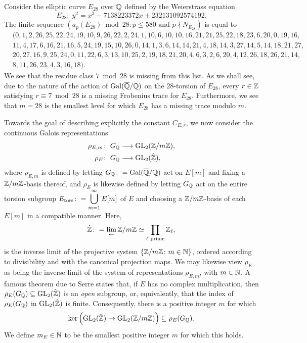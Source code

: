 \begin{example} \label{level28example}
Consider the elliptic curve $E_{28}$ over $\mathbb{Q}$ defined by the Weierstrass equation
\[
E_{28} \colon \; y^2 = x^3 - 7138223372x + 232131092574192.
\]
The finite sequence $\left( a_p(E_{28}) \bmod 28 \colon  p \leq 580 \text{ and } p \nmid N_{E_{28}} \right)$ is equal to
\[
\begin{split}
&( 0, 1, 2, 26, 25, 22, 24, 19, 10, 9, 26, 22, 2, 24, 1, 10, 6, 10, 10, 16, 21, 
21, 25, 22, 18, 23, 6, 20, 0, 19, 16, \\
& 11, 4, 17, 6, 16, 21, 16, 5, 24, 19, 15, 
10, 26, 0, 14, 1, 3, 6, 14, 14, 21, 4, 18, 14, 3, 27, 14, 5, 14, 18, 21, 27,\\
&  20, 27, 16, 9, 25, 24, 0, 11, 22, 6, 3, 13, 10, 25, 2, 19, 18, 21, 20, 4, 6, 3, 2, 6, 20, 4, 12, 26, 18, 26,   21, 14, \\
& 8, 11, 26, 23, 4, 3, 16, 18).
\end{split}
\]
We see that the residue class $7 \bmod 28$ is missing from this list.  As we shall see, due to the nature of the action of $\operatorname{Gal}(\overline{\mathbb{Q}}/\mathbb{Q})$ on the $28$-torsion of $E_{28}$, every $r \in \mathbb{Z}$ satisfying $r \equiv 7 \bmod 28$ is a missing Frobenius trace for $E_{28}$.  Furthermore, we see that $m=28$ is the smallest level for which $E_{28}$ has a missing trace modulo $m$.
\end{example}

Towards the goal of describing explicitly the constant $C_{E,r}$, we now consider the continuous Galois representations
\[
\begin{split}
\rho_{E,m} \colon \; &G_{\mathbb{Q}} \longrightarrow \operatorname{GL}_2(\mathbb{Z}/m\mathbb{Z}), \\
\rho_E \colon \; &G_{\mathbb{Q}} \longrightarrow \operatorname{GL}_2(\hat{\mathbb{Z}}),
\end{split}
\]
where $\rho_{E,m}$ is defined by letting $G_{\mathbb{Q}} \colon= \operatorname{Gal}(\overline{\mathbb{Q}}/\mathbb{Q})$ act on $E[m]$ and fixing a $\mathbb{Z}/m\mathbb{Z}$-basis thereof, and $\rho_E$ is likewise defined by letting $G_{\mathbb{Q}}$ act on the entire torsion subgroup $\displaystyle E_{\operatorname{tors}} \colon= \bigcup_{m=1}^\infty E[m]$ of $E$ and choosing a $\mathbb{Z}/m\mathbb{Z}$-basis of each $E[m]$ in a compatible manner.  Here,
\[
\hat{\mathbb{Z}} \colon= \lim_{ \leftarrow } \mathbb{Z}/m\mathbb{Z} \simeq \prod_{\ell \text{ prime}} \mathbb{Z}_{\ell},
\]
is the inverse limit of the projective system $\{ \mathbb{Z}/m\mathbb{Z} \colon m \in \mathbb{N} \}$, ordered according to divisibility and with the canonical projection maps.  We may likewise view $\rho_E$ as being the inverse limit of the system of representations $\rho_{E,m}$, with $m \in \mathbb{N}$.  A famous theorem due to Serre \cite{serre} states that, if $E$ has no complex multiplication, then $\rho_E(G_{\mathbb{Q}}) \subseteq \operatorname{GL}_2(\hat{\mathbb{Z}})$ is an \emph{open} subgroup, or, equivalently, that the index of $\rho_E(G_{\mathbb{Q}})$ in $\operatorname{GL}_2(\hat{\mathbb{Z}})$ is finite.  Consequently, there is a positive integer $m$ for which
\begin{equation*} %
\ker \left( \GL_2(\hat{\mbz}) \rightarrow \GL_2(\mbz/m\mbz) \right) \subseteq \rho_E(G_\mbq).
\end{equation*}
We define $m_E \in \mathbb{N}$ to be the smallest positive integer $m$ for which this holds.  

